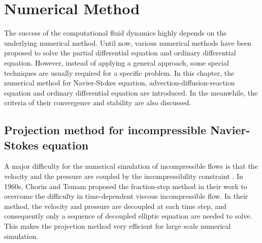 \chapter{Numerical Method}
The success of the computational fluid dynamics highly depends on the underlying numerical method. Until now, various numerical methods have been proposed to solve the partial differential equation and ordinary differential equation. However, instead of applying a general approach, some special techniques are usually required for a specific problem. In this chapter, the numerical method for Navier-Stokes equation, advection-diffusion-reaction equation and ordinary differential equation are introduced. In the meanwhile, the criteria of their convergence and stability are also discussed.

\section{Projection method for incompressible Navier-Stokes equation}
A major difficulty for the numerical simulation of incompressible flows is that the velocity and the pressure are coupled by the incompressibility constraint \cite{Guermond2006Overview}. In 1960s, Chorin and Temam proposed the fraction-step method in their work \cite{Temam1969approximation, Chorin1968Numerical} to overcome the difficulty in time-dependent viscous incompressible flow. In their method, the velocity and pressure are decoupled at each time step, and consequently only a sequence of decoupled elliptic equation are needed to solve. This makes the projection method very efficient for large scale numerical simulation.

